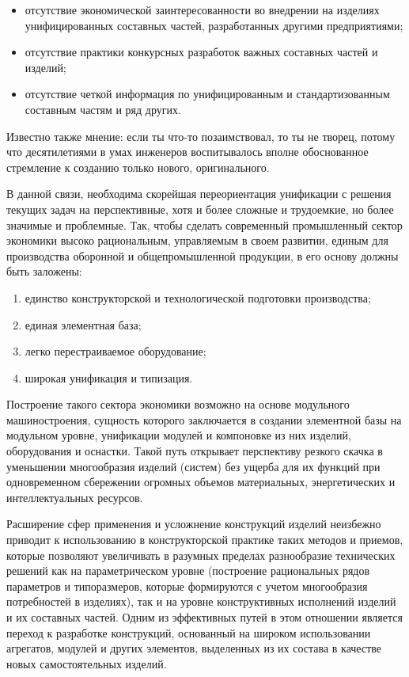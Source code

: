 \begin{itemize}
	\item отсутствие экономической заинтересованности во внедрении на изделиях унифицированных составных частей, разработанных другими предприятиями;
	\item отсутствие практики конкурсных разработок важных составных частей и изделий;
	\item отсутствие четкой информация по унифицированным и стандартизованным составным частям и ряд других.
\end{itemize}

Известно также мнение: если ты что-то позаимствовал, то ты не творец, потому что десятилетиями в умах инженеров воспитывалось вполне обоснованное стремление к созданию только нового, оригинального.

В данной связи, необходима скорейшая переориентация унификации с решения текущих задач на перспективные, хотя и более сложные и трудоемкие, но более значимые и проблемные. Так, чтобы сделать современный промышленный сектор экономики высоко рациональным, управляемым в своем развитии, единым для производства оборонной и общепромышленной продукции, в его основу должны быть заложены:

\begin{enumerate}
	\item единство конструкторской и технологической подготовки производства;
	\item единая элементная база;
	\item легко перестраиваемое оборудование;
	\item широкая унификация и типизация.
\end{enumerate}
 

Построение такого сектора экономики возможно на основе модульного машиностроения, сущность которого заключается в создании элементной базы на модульном уровне, унификации модулей и компоновке из них изделий, оборудования и оснастки. Такой путь открывает перспективу резкого скачка в уменьшении многообразия изделий (систем) без ущерба для их функций при одновременном сбережении огромных объемов материальных, энергетических и интеллектуальных ресурсов.

Расширение сфер применения и усложнение конструкций изделий неизбежно приводит к использованию в конструкторской практике таких методов и приемов, которые позволяют увеличивать в разумных пределах разнообразие технических решений как на параметрическом уровне (построение рациональных рядов параметров и типоразмеров, которые формируются с учетом многообразия потребностей в изделиях), так и на уровне конструктивных исполнений изделий и их составных частей. Одним из эффективных путей в этом отношении является переход к разработке конструкций, основанный на широком использовании агрегатов, модулей и других элементов, выделенных из их состава в качестве новых самостоятельных изделий.

